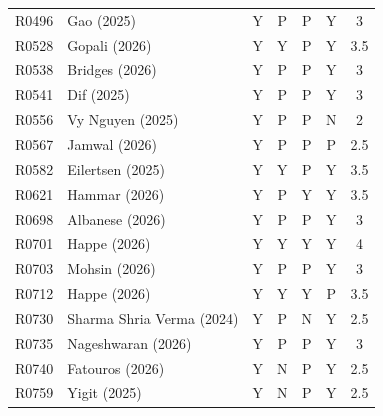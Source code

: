 \begin{longtable}{@{}lp{}ccccc@{}}
R0496 & Gao (2025) \cite{R0496_Gao_2025} & Y & P & P & Y & 3 \\
R0528 & Gopali (2026) \cite{R0528_Gopali_2026} & Y & Y & P & Y & 3.5 \\
R0538 & Bridges (2026) \cite{R0538_Bridges_2026} & Y & P & P & Y & 3 \\
R0541 & Dif (2025) \cite{R0541_Dif_2025} & Y & P & P & Y & 3 \\
R0556 & Vy Nguyen (2025) \cite{R0556_Vy_Nguyen_2025} & Y & P & P & N & 2 \\
R0567 & Jamwal (2026) \cite{R0567_Jamwal_2026} & Y & P & P & P & 2.5 \\
R0582 & Eilertsen (2025) \cite{R0582_Eilertsen_2025} & Y & Y & P & Y & 3.5 \\
R0621 & Hammar (2026) \cite{R0621_Hammar_2026} & Y & P & Y & Y & 3.5 \\
R0698 & Albanese (2026) \cite{R0698_Albanese_2026} & Y & P & P & Y & 3 \\
R0701 & Happe (2026) \cite{R0701_Happe_2026} & Y & Y & Y & Y & 4 \\
R0703 & Mohsin (2026) \cite{R0703_Mohsin_2026} & Y & P & P & Y & 3 \\
R0712 & Happe (2026) \cite{R0712_Happe_2026} & Y & Y & Y & P & 3.5 \\
R0730 & Sharma Shria Verma (2024) \cite{R0730_Sharma_Shria_Verma_2024} & Y & P & N & Y & 2.5 \\
R0735 & Nageshwaran (2026) \cite{R0735_Nageshwaran_2026} & Y & P & P & Y & 3 \\
R0740 & Fatouros (2026) \cite{R0740_Fatouros_2026} & Y & N & P & Y & 2.5 \\
R0759 & Yigit (2025) \cite{R0759_Yigit_2025} & Y & N & P & Y & 2.5 \\
\end{longtable}
